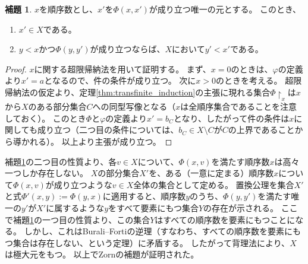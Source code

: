 ﻿\documentclass{ltjsarticle}
\theoremstyle{definition}
\newtheorem{lemma}{補題}
\begin{document}
\begin{lemma}
    \label{lem:appendix_property_of_Phi}
    $x$を順序数とし、$x'$を$\Phi(x,x')$が成り立つ唯一の元とする。
    このとき、
    \begin{enumerate}
        \item $x' \in X$である。
        \item $y < x$かつ$\Phi(y,y')$が成り立つならば、$X$において$y' < x'$である。
    \end{enumerate}
\end{lemma}
\begin{proof}
    $x$に関する超限帰納法を用いて証明する。
    まず、$x = 0$のときは、$\varphi$の定義より$x' = a$となるので、件の条件が成り立つ。
    次に$x > 0$のときを考える。
    超限帰納法の仮定より、定理\ref{thm:transfinite_induction}の主張に現れる集合$\Phi\!\upharpoonright_x$は$x$から$X$のある部分集合$C$への同型写像となる（$x$は全順序集合であることを注意しておく）。
    このとき$\Phi$と$\varphi$の定義より$x' = b_C$となり、したがって件の条件は$x$に関しても成り立つ（二つ目の条件については、$b_C \in X \setminus C$が$C$の上界であることから導かれる）。
    以上より主張が成り立つ。
\end{proof}

補題\ref{lem:appendix_property_of_Phi}の二つ目の性質より、各$v \in X$について、$\Phi(x,v)$を満たす順序数$x$は高々一つしか存在しない。
$X$の部分集合$X'$を、ある（一意に定まる）順序数$x$について$\Phi(x,v)$が成り立つような$v \in X$全体の集合として定める。
置換公理を集合$X'$と式$\Phi'(x,y) := \Phi(y,x)$に適用すると、順序数$y$のうち、$\Phi(y,y')$を満たす唯一の$y'$が$X'$に属するような$y$をすべて要素にもつ集合$Y$の存在が示される。
ここで補題\ref{lem:appendix_property_of_Phi}の一つ目の性質より、この集合$Y$はすべての順序数を要素にもつことになる。
しかし、これはBurali--Fortiの逆理（すなわち、すべての順序数を要素にもつ集合は存在しない、という定理）に矛盾する。
したがって背理法により、$X$は極大元をもつ。
以上でZornの補題が証明された。
\end{document}
